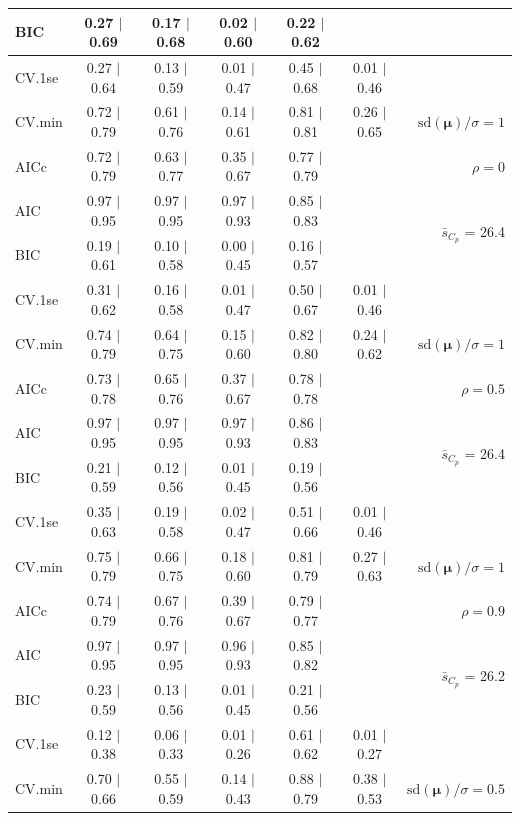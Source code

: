 \documentclass[12pt]{article}
\newcommand{\mr}[1]{\mathrm{#1}}
\newcommand{\bm}[1]{\mathbf{#1}}
\begin{document}
\begin{table}[p]
\begin{center}
\begin{tabular}{l*{5}{c}|r}
BIC & 0.27 $\mid$ 0.69 & 0.17 $\mid$ 0.68 & 0.02 $\mid$ 0.60 & 0.22 $\mid$ 0.62 & & \\
 \hline 
CV.1se & 0.27 $\mid$ 0.64 & 0.13 $\mid$ 0.59 & 0.01 $\mid$ 0.47 & 0.45 $\mid$ 0.68 & 0.01 $\mid$ 0.46 &\\
CV.min & 0.72 $\mid$ 0.79 & 0.61 $\mid$ 0.76 & 0.14 $\mid$ 0.61 & 0.81 $\mid$ 0.81 & 0.26 $\mid$ 0.65 &  $\mr{sd}(\bm{\mu})/\sigma=1$ \\
AICc & 0.72 $\mid$ 0.79 & 0.63 $\mid$ 0.77 & 0.35 $\mid$ 0.67 & 0.77 $\mid$ 0.79 & & $\rho=0$ \\
AIC & 0.97 $\mid$ 0.95 & 0.97 $\mid$ 0.95 & 0.97 $\mid$ 0.93 & 0.85 $\mid$ 0.83 & & \multirow{2}{*}{$\bar{s}_{C_p}$ = 26.4} \\
BIC & 0.19 $\mid$ 0.61 & 0.10 $\mid$ 0.58 & 0.00 $\mid$ 0.45 & 0.16 $\mid$ 0.57 & & \\
 \hline 
CV.1se & 0.31 $\mid$ 0.62 & 0.16 $\mid$ 0.58 & 0.01 $\mid$ 0.47 & 0.50 $\mid$ 0.67 & 0.01 $\mid$ 0.46 &\\
CV.min & 0.74 $\mid$ 0.79 & 0.64 $\mid$ 0.75 & 0.15 $\mid$ 0.60 & 0.82 $\mid$ 0.80 & 0.24 $\mid$ 0.62 &  $\mr{sd}(\bm{\mu})/\sigma=1$ \\
AICc & 0.73 $\mid$ 0.78 & 0.65 $\mid$ 0.76 & 0.37 $\mid$ 0.67 & 0.78 $\mid$ 0.78 & & $\rho=0.5$ \\
AIC & 0.97 $\mid$ 0.95 & 0.97 $\mid$ 0.95 & 0.97 $\mid$ 0.93 & 0.86 $\mid$ 0.83 & & \multirow{2}{*}{$\bar{s}_{C_p}$ = 26.4} \\
BIC & 0.21 $\mid$ 0.59 & 0.12 $\mid$ 0.56 & 0.01 $\mid$ 0.45 & 0.19 $\mid$ 0.56 & & \\
 \hline 
CV.1se & 0.35 $\mid$ 0.63 & 0.19 $\mid$ 0.58 & 0.02 $\mid$ 0.47 & 0.51 $\mid$ 0.66 & 0.01 $\mid$ 0.46 &\\
CV.min & 0.75 $\mid$ 0.79 & 0.66 $\mid$ 0.75 & 0.18 $\mid$ 0.60 & 0.81 $\mid$ 0.79 & 0.27 $\mid$ 0.63 &  $\mr{sd}(\bm{\mu})/\sigma=1$ \\
AICc & 0.74 $\mid$ 0.79 & 0.67 $\mid$ 0.76 & 0.39 $\mid$ 0.67 & 0.79 $\mid$ 0.77 & & $\rho=0.9$ \\
AIC & 0.97 $\mid$ 0.95 & 0.97 $\mid$ 0.95 & 0.96 $\mid$ 0.93 & 0.85 $\mid$ 0.82 & & \multirow{2}{*}{$\bar{s}_{C_p}$ = 26.2} \\
BIC & 0.23 $\mid$ 0.59 & 0.13 $\mid$ 0.56 & 0.01 $\mid$ 0.45 & 0.21 $\mid$ 0.56 & & \\
 \hline 
CV.1se & 0.12 $\mid$ 0.38 & 0.06 $\mid$ 0.33 & 0.01 $\mid$ 0.26 & 0.61 $\mid$ 0.62 & 0.01 $\mid$ 0.27 &\\
CV.min & 0.70 $\mid$ 0.66 & 0.55 $\mid$ 0.59 & 0.14 $\mid$ 0.43 & 0.88 $\mid$ 0.79 & 0.38 $\mid$ 0.53 &  $\mr{sd}(\bm{\mu})/\sigma=0.5$ \\

\end{tabular}
\end{center}
\end{table}
\end{document}
